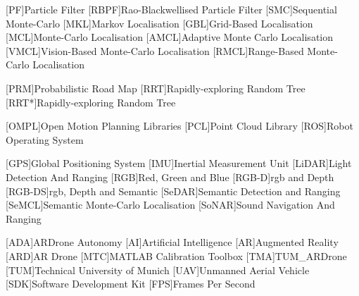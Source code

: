 \begin{acronym}[RANSAC]
  [PF]{Particle Filter}
  [RBPF]{Rao-Blackwellised Particle Filter}
  [SMC]{Sequential Monte-Carlo}
  [MKL]{Markov Localisation}
  [GBL]{Grid-Based Localisation}
  [MCL]{Monte-Carlo Localisation}
  [AMCL]{Adaptive Monte Carlo Localisation}
  [VMCL]{Vision-Based Monte-Carlo Localisation}
  [RMCL]{Range-Based Monte-Carlo Localisation}
  
  [PRM]{Probabilistic Road Map}
  [RRT]{Rapidly-exploring Random Tree}
  [RRT*]{Rapidly-exploring Random Tree}
  
 
[OMPL]{Open Motion Planning Libraries}
[PCL]{Point Cloud Library}
[ROS]{Robot Operating System}

[GPS]{Global Positioning System}
[IMU]{Inertial Measurement Unit}
[LiDAR]{Light Detection And Ranging}
[RGB]{Red, Green and Blue}
[RGB-D]{\acs{rgb} and Depth}
[RGB-DS]{\acs{rgb}, Depth and Semantic}
[SeDAR]{Semantic Detection and Ranging}
[SeMCL]{Semantic Monte-Carlo Localisation}
[SoNAR]{Sound Navigation And Ranging}

[ADA]{ARDrone Autonomy}
[AI]{Artificial Intelligence}
[AR]{Augmented Reality}
[ARD]{AR Drone}
[MTC]{MATLAB Calibration Toolbox}
[TMA]{TUM\_ARDrone}
[TUM]{Technical University of Munich}
[UAV]{Unmanned Aerial Vehicle}
[SDK]{Software Development Kit}
[FPS]{Frames Per Second}
\end{acronym}
